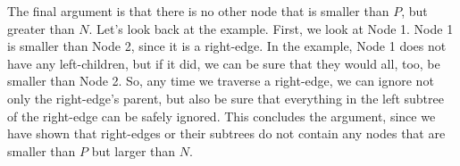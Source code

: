 \begin{solution}[2.5in]
The final argument is that there is no other node that is smaller than $P$, but
greater than $N$. Let's look back at the example. First, we look at Node 1.
Node 1 is smaller than Node 2, since it is a right-edge. In the example, Node 1
does not have any left-children, but if it did, we can be sure that they would
all, too, be smaller than Node 2. So, any time we traverse a right-edge, we can
ignore not only the right-edge's parent, but also be sure that everything in
the left subtree of the right-edge can be safely ignored. This concludes the
argument, since we have shown that right-edges or their subtrees do not contain
any nodes that are smaller than $P$ but larger than $N$.
\end{solution}
